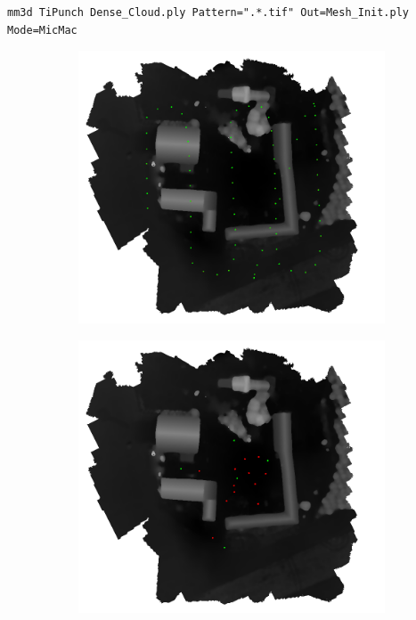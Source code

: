 \begin{verbatim}
mm3d TiPunch Dense_Cloud.ply Pattern=".*.tif" Out=Mesh_Init.ply Mode=MicMac
\end{verbatim}

\begin{figure}
        \begin{subfigure}[b]{0.33\textwidth}
                \includegraphics[width=\linewidth]{FIGS/TaskCorrel/Viabon/Protocol_Acquisition_2.png}
        \end{subfigure}%
        	\hfill
        \begin{subfigure}[b]{0.33\textwidth}
                \includegraphics[width=\linewidth]{FIGS/TaskCorrel/Viabon/PtsTerrainDistribution_2.png}

\end{subfigure}
\end{figure}
